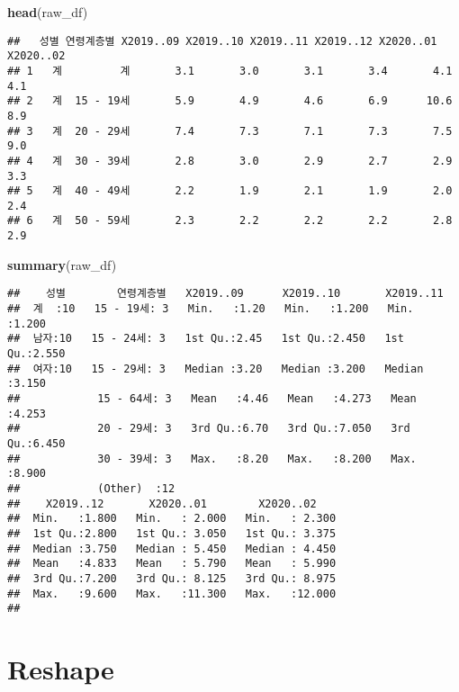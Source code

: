 \documentclass[]{article}
\newenvironment{Shaded}{\begin{snugshade}}{\end{snugshade}}
\newcommand{\KeywordTok}[1]{\textcolor[rgb]{0.13,0.29,0.53}{\textbf{#1}}}
\newcommand{\NormalTok}[1]{#1}
\begin{document}
\begin{Shaded}
\begin{Highlighting}[]
\KeywordTok{head}\NormalTok{(raw_df)}
\end{Highlighting}
\end{Shaded}

\begin{verbatim}
##   성별 연령계층별 X2019..09 X2019..10 X2019..11 X2019..12 X2020..01 X2020..02
## 1   계         계       3.1       3.0       3.1       3.4       4.1       4.1
## 2   계  15 - 19세       5.9       4.9       4.6       6.9      10.6       8.9
## 3   계  20 - 29세       7.4       7.3       7.1       7.3       7.5       9.0
## 4   계  30 - 39세       2.8       3.0       2.9       2.7       2.9       3.3
## 5   계  40 - 49세       2.2       1.9       2.1       1.9       2.0       2.4
## 6   계  50 - 59세       2.3       2.2       2.2       2.2       2.8       2.9
\end{verbatim}

\begin{Shaded}
\begin{Highlighting}[]
\KeywordTok{summary}\NormalTok{(raw_df)}
\end{Highlighting}
\end{Shaded}

\begin{verbatim}
##    성별        연령계층별   X2019..09      X2019..10       X2019..11    
##  계  :10   15 - 19세: 3   Min.   :1.20   Min.   :1.200   Min.   :1.200  
##  남자:10   15 - 24세: 3   1st Qu.:2.45   1st Qu.:2.450   1st Qu.:2.550  
##  여자:10   15 - 29세: 3   Median :3.20   Median :3.200   Median :3.150  
##            15 - 64세: 3   Mean   :4.46   Mean   :4.273   Mean   :4.253  
##            20 - 29세: 3   3rd Qu.:6.70   3rd Qu.:7.050   3rd Qu.:6.450  
##            30 - 39세: 3   Max.   :8.20   Max.   :8.200   Max.   :8.900  
##            (Other)  :12                                                 
##    X2019..12       X2020..01        X2020..02     
##  Min.   :1.800   Min.   : 2.000   Min.   : 2.300  
##  1st Qu.:2.800   1st Qu.: 3.050   1st Qu.: 3.375  
##  Median :3.750   Median : 5.450   Median : 4.450  
##  Mean   :4.833   Mean   : 5.790   Mean   : 5.990  
##  3rd Qu.:7.200   3rd Qu.: 8.125   3rd Qu.: 8.975  
##  Max.   :9.600   Max.   :11.300   Max.   :12.000  
## 
\end{verbatim}

\hypertarget{reshape}{%
\section{Reshape}\label{reshape}}
\end{document}
